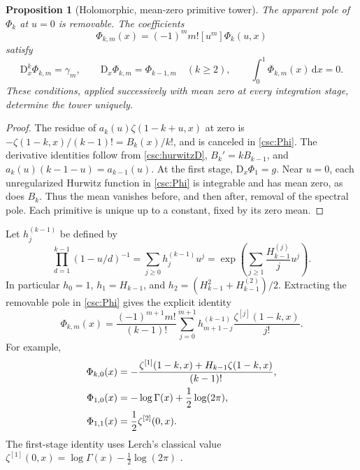 \documentclass[11pt,a4paper]{article}
\numberwithin{equation}{section}
\newtheorem{proposition}[theorem]{Proposition}
\theoremstyle{definition}
\newcommand{\dd}{\,\mathrm dx}
\newcommand{\D}{\mathrm D}
\begin{document}
\begin{proposition}[Holomorphic, mean-zero primitive tower]\label{csc:Phitheorem}
The apparent pole of $\Phi_k$ at $u=0$ is removable. The coefficients
\begin{equation}\label{csc:Phim}
\Phi_{k,m}(x)=(-1)^mm![u^m]\Phi_k(u,x)
\end{equation}
satisfy
\[
\D_x^k\Phi_{k,m}=\gamma_m,\qquad
\D_x\Phi_{k,m}=\Phi_{k-1,m}\quad(k\ge2),\qquad
\int_0^1\Phi_{k,m}(x)\dd=0.
\]
These conditions, applied successively with mean zero at every integration stage, determine the tower uniquely.
\end{proposition}
\begin{proof}
The residue of $a_k(u)\zeta(1-k+u,x)$ at zero is
$-\zeta(1-k,x)/(k-1)!=B_k(x)/k!$, and is canceled in \eqref{csc:Phi}. The derivative identities follow from \eqref{csc:hurwitzD}, $B_k'=kB_{k-1}$, and $a_k(u)(k-1-u)=a_{k-1}(u)$. At the first stage, $\D_x\Phi_1=g$. Near $u=0$, each unregularized Hurwitz function in \eqref{csc:Phi} is integrable and has mean zero, as does $B_k$. Thus the mean vanishes before, and then after, removal of the spectral pole. Each primitive is unique up to a constant, fixed by its zero mean.
\end{proof}
Let $h_j^{(k-1)}$ be defined by
\begin{equation}\label{csc:hcomplete}
\prod_{d=1}^{k-1}(1-u/d)^{-1}=\sum_{j\ge0}h_j^{(k-1)}u^j
=\exp\left(\sum_{j\ge1}\frac{H_{k-1}^{(j)}}j u^j\right).
\end{equation}
In particular $h_0=1$, $h_1=H_{k-1}$, and
$h_2=(H_{k-1}^2+H_{k-1}^{(2)})/2$. Extracting the removable pole in \eqref{csc:Phi} gives the explicit identity
\begin{equation}\label{csc:Phiexplicit}
\Phi_{k,m}(x)=\frac{(-1)^{m+1}m!}{(k-1)!}
\sum_{j=0}^{m+1}h_{m+1-j}^{(k-1)}\frac{\zeta^{[j]}(1-k,x)}{j!}.
\end{equation}
For example,
\begin{align}
\Phi_{k,0}(x)&=-\frac{\zeta^{[1]}(1-k,x)+H_{k-1}\zeta(1-k,x)}{(k-1)!},\label{csc:Phik0}\\
\Phi_{1,0}(x)&=-\log\Gamma(x)+\frac12\log(2\pi),\notag\\
\Phi_{1,1}(x)&=\frac12\zeta^{[2]}(0,x).\notag
\end{align}
The first-stage identity uses Lerch's classical value $\zeta^{[1]}(0,x)=\log\Gamma(x)-\tfrac12\log(2\pi)$ \cite{csc:DLMFhurwitz}.
\end{document}
